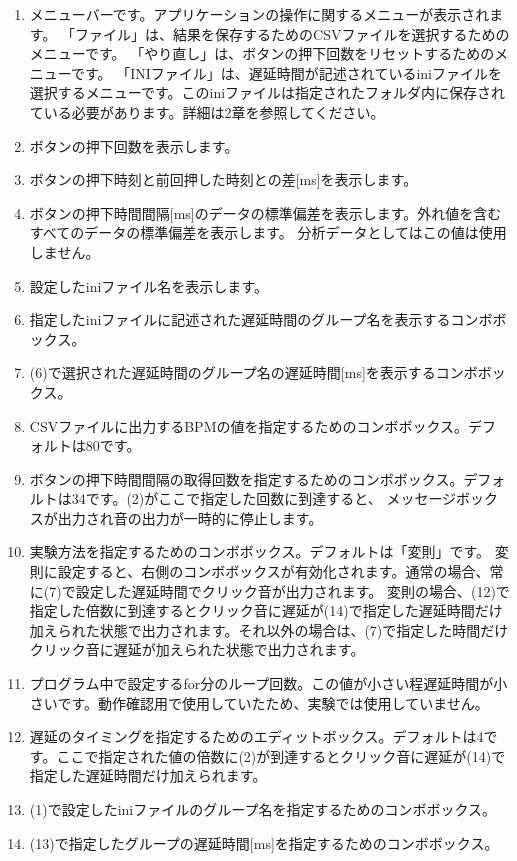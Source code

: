 \documentclass{article} %
\begin{document}
\begin{enumerate}
  \item メニューバーです。アプリケーションの操作に関するメニューが表示されます。
  「ファイル」は、結果を保存するためのCSVファイルを選択するためのメニューです。
  「やり直し」は、ボタンの押下回数をリセットするためのメニューです。
  「INIファイル」は、遅延時間が記述されているiniファイルを選択するメニューです。このiniファイルは指定されたフォルダ内に保存されている必要があります。詳細は2章を参照してください。
  \item ボタンの押下回数を表示します。
  \item ボタンの押下時刻と前回押した時刻との差[ms]を表示します。 
  \item ボタンの押下時間間隔[ms]のデータの標準偏差を表示します。外れ値を含むすべてのデータの標準偏差を表示します。
  分析データとしてはこの値は使用しません。
  \item 設定したiniファイル名を表示します。
  \item 指定したiniファイルに記述された遅延時間のグループ名を表示するコンボボックス。
  \item (6)で選択された遅延時間のグループ名の遅延時間[ms]を表示するコンボボックス。
  \item CSVファイルに出力するBPMの値を指定するためのコンボボックス。デフォルトは80です。
  \item ボタンの押下時間間隔の取得回数を指定するためのコンボボックス。デフォルトは34です。(2)がここで指定した回数に到達すると、
  メッセージボックスが出力され音の出力が一時的に停止します。
  \item 実験方法を指定するためのコンボボックス。デフォルトは「変則」です。
  変則に設定すると、右側のコンボボックスが有効化されます。通常の場合、常に(7)で設定した遅延時間でクリック音が出力されます。
  変則の場合、(12)で指定した倍数に到達するとクリック音に遅延が(14)で指定した遅延時間だけ加えられた状態で出力されます。それ以外の場合は、(7)で指定した時間だけクリック音に遅延が加えられた状態で出力されます。
  \item プログラム中で設定するfor分のループ回数。この値が小さい程遅延時間が小さいです。動作確認用で使用していたため、実験では使用していません。
  \item 遅延のタイミングを指定するためのエディットボックス。デフォルトは4です。ここで指定された値の倍数に(2)が到達するとクリック音に遅延が(14)で指定した遅延時間だけ加えられます。
  \item (1)で設定したiniファイルのグループ名を指定するためのコンボボックス。
  \item (13)で指定したグループの遅延時間[ms]を指定するためのコンボボックス。

\end{enumerate}
\end{document}
